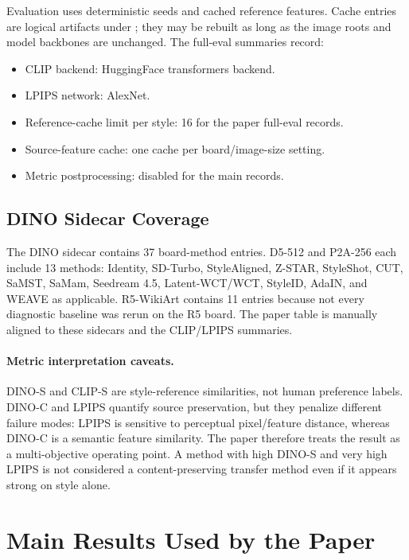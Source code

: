 \documentclass[letterpaper]{article}
\newcommand{\weave}{WEAVE}
\newcommand{\dinos}{DINO-S}
\newcommand{\dinoc}{DINO-C}
\newcommand{\clips}{CLIP-S}
\begin{document}
Evaluation uses deterministic seeds and cached reference features. Cache entries are
logical artifacts under ; they may be rebuilt as long as
the image roots and model backbones are unchanged. The full-eval summaries record:
\begin{itemize}[leftmargin=1.5em,itemsep=0.2em]
  \item CLIP backend: HuggingFace transformers backend.
  \item LPIPS network: AlexNet.
  \item Reference-cache limit per style: 16 for the paper full-eval records.
  \item Source-feature cache: one cache per board/image-size setting.
  \item Metric postprocessing: disabled for the main records.
\end{itemize}

\subsection{DINO Sidecar Coverage}

The DINO sidecar contains 37 board-method entries. D5-512 and P2A-256 each include 13
methods: Identity, SD-Turbo, StyleAligned, Z-STAR, StyleShot, CUT, SaMST, SaMam,
Seedream 4.5, Latent-WCT/WCT, StyleID, AdaIN, and \weave{} as applicable. R5-WikiArt
contains 11 entries because not every diagnostic baseline was rerun on the R5 board.
The paper table is manually aligned to these sidecars and the CLIP/LPIPS summaries.

\paragraph{Metric interpretation caveats.}
\dinos{} and \clips{} are style-reference similarities, not human preference labels.
\dinoc{} and LPIPS quantify source preservation, but they penalize different failure
modes: LPIPS is sensitive to perceptual pixel/feature distance, whereas \dinoc{} is a
semantic feature similarity. The paper therefore treats the result as a multi-objective
operating point. A method with high \dinos{} and very high LPIPS is not considered a
content-preserving transfer method even if it appears strong on style alone.

\section{Main Results Used by the Paper}
\end{document}
